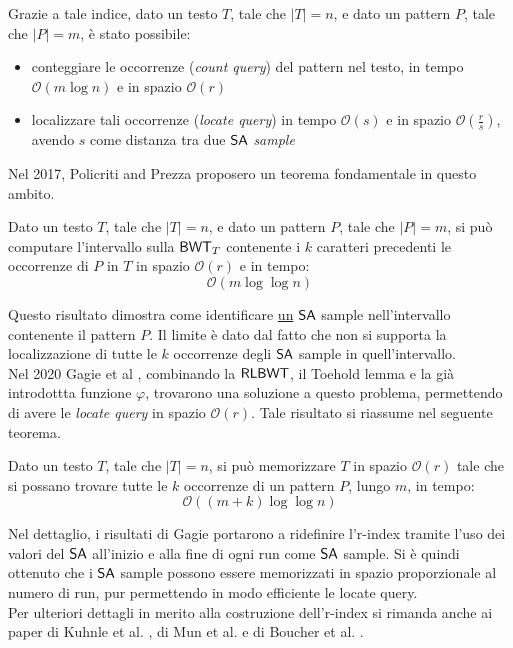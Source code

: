 Grazie a tale indice, dato un testo $T$, tale che
$|T|=n$, e dato un pattern $P$, tale che $|P|=m$, è stato possibile: 
\begin{itemize}
  \item conteggiare le occorrenze (\textit{count query}) del pattern nel testo,
  in tempo $\mathcal{O}(m\log n)$ e in spazio $\mathcal{O}(r)$  
  \item localizzare tali occorrenze (\textit{locate query}) in tempo
  $\mathcal{O}(s)$ e in spazio $\mathcal{O}\left(\frac{r}{s}\right)$, avendo $s$
  come distanza tra due $\mbox{\rm {\sf SA}}$ \textit{sample}
\end{itemize}
Nel 2017, Policriti and Prezza \cite{policriti} proposero un teorema
fondamentale in questo ambito.
\begin{teorema}
  Dato un testo $T$, tale che $|T|=n$, e dato un pattern $P$, tale
  che $|P|=m$, si può computare l'intervallo sulla $\mbox{\rm {\sf BWT}}_T$ contenente i $k$
  caratteri precedenti le occorrenze di $P$ in $T$ in spazio $\mathcal{O}(r)$ e
  in tempo: 
  \begin{equation}
    \label{eq:rlbwt3}
    \mathcal{O}(m\log\log n)
  \end{equation}
\end{teorema}
Questo risultato dimostra come identificare \underline{un} $\mbox{\rm {\sf SA}}$ sample
nell'intervallo 
contenente il pattern $P$. Il limite è dato dal fatto che non si supporta la
localizzazione di tutte le $k$ occorrenze degli $\mbox{\rm {\sf SA}}$ sample in
quell'intervallo.\\
Nel 2020 Gagie et al \cite{gagie2020}, combinando la $\mbox{\rm {\sf RLBWT}}$, il
Toehold lemma e la già introdottta funzione $\varphi$, trovarono una soluzione a
questo problema, permettendo di avere le \textit{locate 
  query} in spazio $\mathcal{O}(r)$.
Tale risultato si riassume nel seguente teorema.
\begin{teorema}
  Dato un testo $T$, tale che $|T|=n$, si può memorizzare $T$ in spazio
  $\mathcal{O}(r)$ tale che si possano trovare tutte le $k$ occorrenze di un
  pattern $P$, lungo $m$, in tempo:
  \begin{equation}
    \label{eq:rlbwt4}
    \mathcal{O}((m+k)\log\log n)
  \end{equation}
\end{teorema}
Nel dettaglio, i risultati di Gagie portarono a ridefinire l'r-index
tramite l'uso dei valori del $\mbox{\rm {\sf SA}}$ all'inizio e alla fine di ogni run come
$\mbox{\rm {\sf SA}}$ sample. Si è quindi ottenuto che i $\mbox{\rm {\sf SA}}$ sample possono
essere memorizzati in spazio proporzionale al numero di run, 
pur permettendo in modo efficiente le locate query.\\
Per ulteriori dettagli in merito alla costruzione dell'r-index si rimanda anche
ai 
paper di Kuhnle et al. \cite{kuhnle}, di Mun et al. \cite{mun} e di Boucher et
al. \cite{boucher}. 
